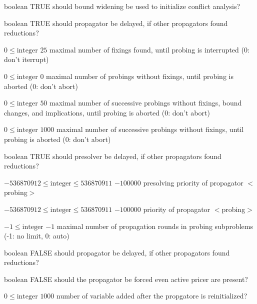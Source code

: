%
{boolean}%
{TRUE}%
{should bound widening be used to initialize conflict analysis?}%
{}

%
{boolean}%
{TRUE}%
{should propagator be delayed, if other propagators found reductions?}%
{}

%
{$0\leq\textrm{integer}$}%
{$25$}%
{maximal number of fixings found, until probing is interrupted (0: don't iterrupt)}%
{}

%
{$0\leq\textrm{integer}$}%
{$0$}%
{maximal number of probings without fixings, until probing is aborted (0: don't abort)}%
{}

%
{$0\leq\textrm{integer}$}%
{$50$}%
{maximal number of successive probings without fixings, bound changes, and implications, until probing is aborted (0: don't abort)}%
{}

%
{$0\leq\textrm{integer}$}%
{$1000$}%
{maximal number of successive probings without fixings, until probing is aborted (0: don't abort)}%
{}

%
{boolean}%
{TRUE}%
{should presolver be delayed, if other propagators found reductions?}%
{}

%
{$-536870912\leq\textrm{integer}\leq536870911$}%
{$-100000$}%
{presolving priority of propagator $<$probing$>$}%
{}

%
{$-536870912\leq\textrm{integer}\leq536870911$}%
{$-100000$}%
{priority of propagator $<$probing$>$}%
{}

%
{$-1\leq\textrm{integer}$}%
{$-1$}%
{maximal number of propagation rounds in probing subproblems (-1: no limit, 0: auto)}%
{}

%
{boolean}%
{FALSE}%
{should propagator be delayed, if other propagators found reductions?}%
{}

%
{boolean}%
{FALSE}%
{should the propagator be forced even active pricer are present?}%
{}

%
{$0\leq\textrm{integer}$}%
{$1000$}%
{number of variable added after the propgatore is reinitialized?}%
{}

